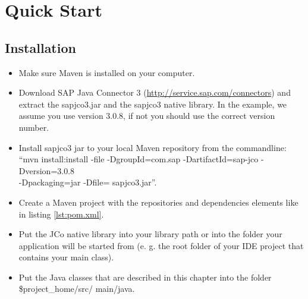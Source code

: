 \chapter{Quick Start}
\label{cha:QuickStart}

\section{Installation}

\begin{itemize}

  \item Make sure Maven is installed on your computer.
  
  \item Download SAP Java Connector 3 (\url{http://service.sap.com/connectors}) and extract the sapjco3.jar and the sapjco3 native library. In the example, we assume you use version 3.0.8, if not you should use the correct version number.
  
  \item Install sapjco3 jar to your local Maven repository from the commandline:\\
  ``mvn install:install -file -DgroupId=com.sap -DartifactId=sap-jco -Dversion=3.0.8\\
  -Dpackaging=jar -Dfile= sapjco3.jar''.
  
  \item Create a Maven project with the repositories and dependencies elements like in listing \ref{lst:pom.xml}. 
  
  \item Put the JCo native library into your library path or into the folder your application will be started
    from (e. g. the root folder of your IDE project that contains your main class).
    
  \item Put the Java classes that are described in this chapter into the folder \$project\_home/src/ main/java.

\end{itemize} 

